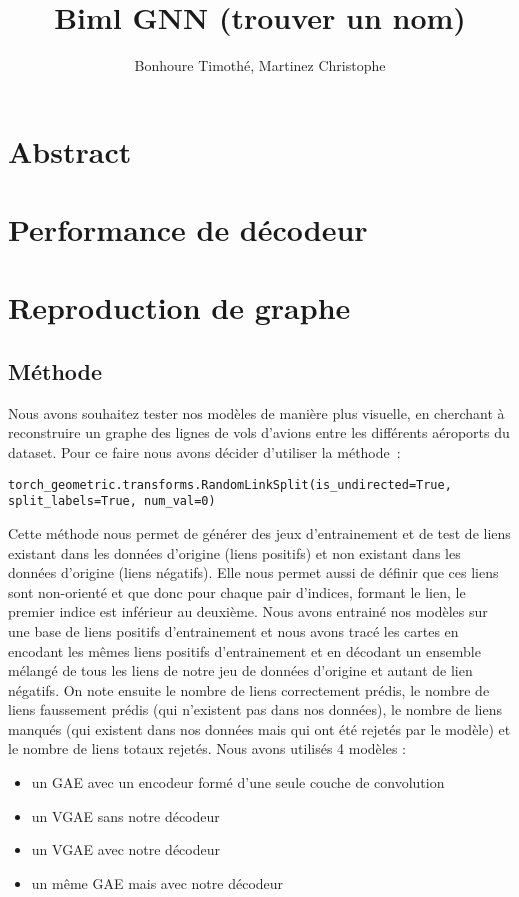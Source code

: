 \documentclass{article}
\begin{document}
\title{Biml GNN (trouver un nom)}
\author{Bonhoure Timothé, Martinez Christophe}                      %

\maketitle
\tableofcontents
\section*{Abstract}
\newpage
\section{Performance de décodeur}


\section{Reproduction de graphe}
\subsection{Méthode}
Nous avons souhaitez tester nos modèles de manière plus visuelle, en cherchant à reconstruire un graphe des lignes de vols d’avions entre les différents aéroports du dataset. Pour ce faire nous avons décider d’utiliser la méthode :
\begin{verbatim}
torch_geometric.transforms.RandomLinkSplit(is_undirected=True, split_labels=True, num_val=0)
\end{verbatim}
Cette méthode nous permet de générer des jeux d’entrainement et de test de liens existant dans les données d’origine (liens positifs) et non existant dans les données d’origine (liens négatifs). Elle nous permet aussi de définir que ces liens sont non-orienté et que donc pour chaque pair d’indices, formant le lien, le premier indice est inférieur au deuxième. Nous avons entrainé nos modèles sur une base de liens positifs d’entrainement et nous avons tracé les cartes en encodant les mêmes liens positifs d’entrainement et en décodant un ensemble mélangé de tous les liens de notre jeu de données d’origine et autant de lien négatifs. On note ensuite le nombre de liens correctement prédis, le nombre de liens faussement prédis (qui n’existent pas dans nos données), le nombre de liens manqués (qui existent dans nos données mais qui ont été rejetés par le modèle) et le nombre de liens totaux rejetés.\newline
Nous avons utilisés 4 modèles :
\begin{itemize}
    \item un GAE avec un encodeur formé d’une seule couche de convolution
    \item un VGAE sans notre décodeur
    \item un VGAE avec notre décodeur
    \item un même GAE mais avec notre décodeur
\end{itemize}
\end{document}
